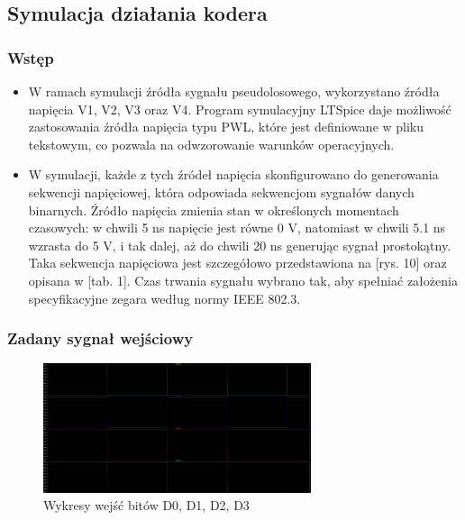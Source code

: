 \documentclass{article}
\begin{document}
\subsection{Symulacja działania kodera}
\subsubsection{Wstęp}
\begin{itemize}
\item W ramach symulacji źródła sygnału pseudolosowego, wykorzystano źródła napięcia V1, V2, V3 oraz V4. Program symulacyjny LTSpice daje możliwość zastosowania źródła napięcia typu PWL, które jest definiowane w pliku tekstowym, co pozwala na odwzorowanie warunków operacyjnych.

\item W symulacji, każde z tych źródeł napięcia skonfigurowano do generowania sekwencji napięciowej, która odpowiada sekwencjom sygnałów danych binarnych. Źródło napięcia zmienia stan w określonych momentach czasowych: w chwili 5 ns napięcie jest równe 0 V, natomiast w chwili 5.1 ns wzrasta do 5 V, i tak dalej, aż do chwili 20 ns generując sygnał prostokątny. Taka sekwencja napięciowa jest szczegółowo przedstawiona na [rys. 10] oraz opisana w [tab. 1]. Czas trwania sygnału wybrano tak, aby spełniać założenia specyfikacyjne zegara według normy IEEE 802.3. \cite{ieee802}

\end{itemize}

\subsubsection{Zadany sygnał wejściowy}
\begin{figure}[ht]
    \centering
    \begin{adjustbox}{center}
        \includegraphics[width=0.70\textwidth]{wejsciowe.jpg}
    \end{adjustbox}
    \caption{Wykresy wejść bitów D0, D1, D2, D3}
    \label{fig:mojobrazek}
\end{figure}
\end{document}
